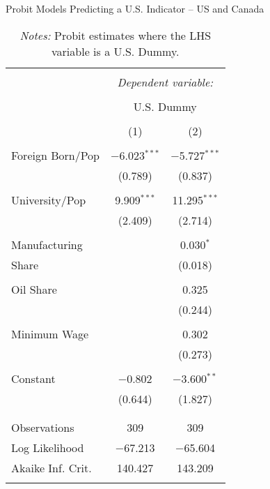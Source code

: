 

\begin{table}[!htbp] \centering 
  \caption{Probit Models Predicting a U.S. Indicator -- US and Canada} 
  \label{tab:dfl_step1} 
\begin{tabular}{@{\extracolsep{5pt}}lcc} 
\\[-1.8ex]\hline 
\hline \\[-1.8ex] 
 & \multicolumn{2}{c}{\textit{Dependent variable:}} \\ 
\cline{2-3} 
\\[-1.8ex] & \multicolumn{2}{c}{U.S. Dummy} \\ 
\\[-1.8ex] & (1) & (2)\\ 
\hline \\[-1.8ex] 
 Foreign Born/Pop & $-$6.023$^{***}$ & $-$5.727$^{***}$ \\ 
  & (0.789) & (0.837) \\ 
  & & \\ 
 University/Pop & 9.909$^{***}$ & 11.295$^{***}$ \\ 
  & (2.409) & (2.714) \\ 
  & & \\ 
 Manufacturing &  & 0.030$^{*}$ \\ 
Share  &  & (0.018) \\ 
  & & \\ 
 Oil Share &  & 0.325 \\ 
  &  & (0.244) \\ 
  & & \\ 
 Minimum Wage &  & 0.302 \\ 
  &  & (0.273) \\ 
  & & \\ 
 Constant & $-$0.802 & $-$3.600$^{**}$ \\ 
  & (0.644) & (1.827) \\ 
  & & \\ 
\hline \\[-1.8ex] 
Observations & 309 & 309 \\ 
Log Likelihood & $-$67.213 & $-$65.604 \\ 
Akaike Inf. Crit. & 140.427 & 143.209 \\ 
\hline 
\hline \\[-1.8ex] 
\end{tabular} 
\caption*{\footnotesize{\textit{Notes:} Probit estimates where the LHS variable is a U.S. Dummy.}}
\end{table} 



